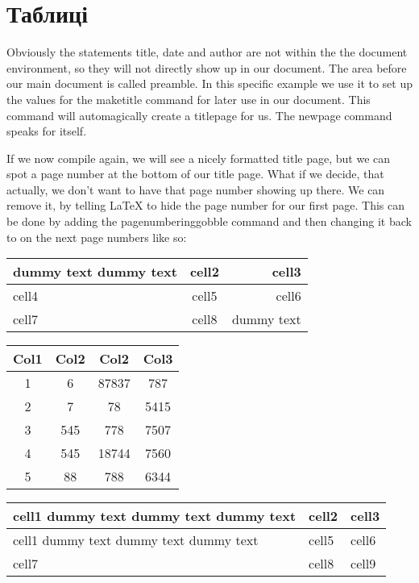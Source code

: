 	
\section{Таблиці}
	
Obviously the statements title, date and author are not within the the document environment, so they will not directly show up in our document. The area before our main document is called preamble. In this specific example we use it to set up the values for the maketitle command for later use in our document. This command will automagically create a titlepage for us. The newpage command speaks for itself.

If we now compile again, we will see a nicely formatted title page, but we can spot a page number at the bottom of our title page. What if we decide, that actually, we don’t want to have that page number showing up there. We can remove it, by telling LaTeX to hide the page number for our first page. This can be done by adding the pagenumbering{gobble} command and then changing it back to  on the next page numbers like so:

\begin{center}
	\begin{tabular}{| l | c | r |}
		\hline
		dummy text dummy text  & cell2 & cell3 \\ 
		\hline
		cell4 & cell5 & cell6 \\ 
		\hline 
		cell7 & cell8 & dummy text  \\   
		\hline
	\end{tabular}
\end{center}

\begin{center}
	\begin{tabular}{||c c c c||} 
		\hline
		Col1 & Col2 & Col2 & Col3 \\ 
		\hline
		1 & 6 & 87837 & 787 \\ 
		\hline
		2 & 7 & 78 & 5415 \\
		\hline
		3 & 545 & 778 & 7507 \\
		\hline
		4 & 545 & 18744 & 7560 \\
		\hline
		5 & 88 & 788 & 6344 \\ 
		\hline
	\end{tabular}
\end{center}


\begin{center}
	\begin{tabular}{ | m{6em} | m{2cm}| m{4cm} | } 
		\hline
		cell1 dummy text dummy text dummy text& cell2 & cell3 \\ 
		\hline
		cell1 dummy text dummy text dummy text & cell5 & cell6 \\ 
		\hline
		cell7 & cell8 & cell9 \\ 
		\hline
	\end{tabular}
\end{center}


